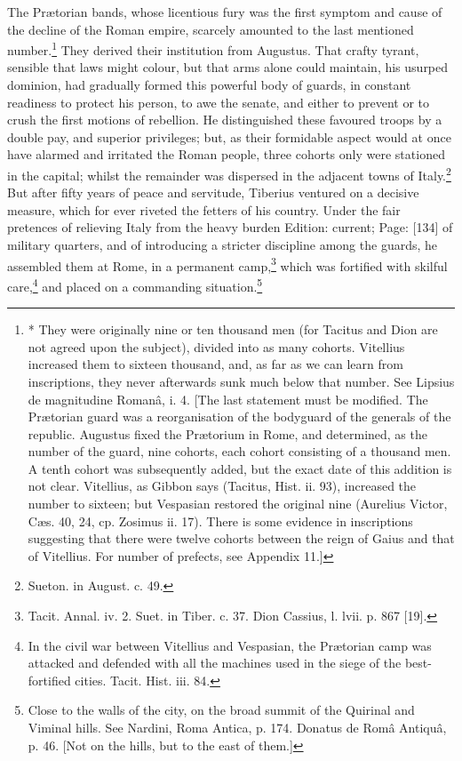 The Prætorian bands, whose licentious fury was the first symptom and cause of the decline of the Roman empire, scarcely amounted to the last mentioned number.\footnote{* They were originally nine or ten thousand men (for Tacitus and Dion are not agreed upon the subject), divided into as many cohorts. Vitellius increased them to sixteen thousand, and, as far as we can learn from inscriptions, they never afterwards sunk much below that number. See Lipsius de magnitudine Romanâ, i. 4. [The last statement must be modified. The Prætorian guard was a reorganisation of the bodyguard of the generals of the republic. Augustus fixed the Prætorium in Rome, and determined, as the number of the guard, nine cohorts, each cohort consisting of a thousand men. A tenth cohort was subsequently added, but the exact date of this addition is not clear. Vitellius, as Gibbon says (Tacitus, Hist. ii. 93), increased the number to sixteen; but Vespasian restored the original nine (Aurelius Victor, Cæs. 40, 24, cp. Zosimus ii. 17). There is some evidence in inscriptions suggesting that there were twelve cohorts between the reign of Gaius and that of Vitellius. For number of prefects, see Appendix 11.]} They derived their institution from Augustus. That crafty tyrant, sensible that laws might colour, but that arms alone could maintain, his usurped dominion, had gradually formed this powerful body of guards, in constant readiness to protect his person, to awe the senate, and either to prevent or to crush the first motions of rebellion. He distinguished these favoured troops by a double pay, and superior privileges; but, as their formidable aspect would at once have alarmed and irritated the Roman people, three cohorts only were stationed in the capital; whilst the remainder was dispersed in the adjacent towns of Italy.\footnote{Sueton. in August. c. 49.} But after fifty years of peace and servitude, Tiberius ventured on a decisive measure, which for ever riveted the fetters of his country. Under the fair pretences of relieving Italy from the heavy burden Edition: current; Page: [134] of military quarters, and of introducing a stricter discipline among the guards, he assembled them at Rome, in a permanent camp,\footnote{Tacit. Annal. iv. 2. Suet. in Tiber. c. 37. Dion Cassius, l. lvii. p. 867 [19].} which was fortified with skilful care,\footnote{In the civil war between Vitellius and Vespasian, the Prætorian camp was attacked and defended with all the machines used in the siege of the best-fortified cities. Tacit. Hist. iii. 84.} and placed on a commanding situation.\footnote{Close to the walls of the city, on the broad summit of the Quirinal and Viminal hills. See Nardini, Roma Antica, p. 174. Donatus de Româ Antiquâ, p. 46. [Not on the hills, but to the east of them.]}

